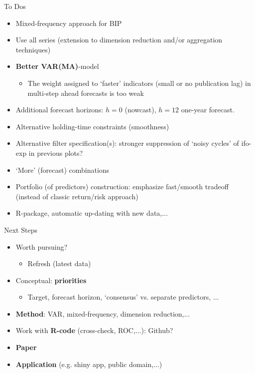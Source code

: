 \documentclass{beamer}
\begin{document}
\begin{frame} {To Dos}
\begin{itemize}
\item Mixed-frequency approach for BIP
\item Use all series (extension to dimension reduction and/or aggregation techniques)
\item \textbf{Better VAR(MA)}-model
\begin{itemize}
\item The weight assigned to `faster' indicators (small or no publication lag) in multi-step ahead forecasts is too weak
\end{itemize}
\item Additional forecast horizons: $h=0$ (nowcast), $h=12$ one-year forecast. 
\item Alternative holding-time constraints (smoothness)
\item Alternative filter specification(s): stronger suppression of `noisy cycles' of ifo-exp in previous plots?
\item `More' (forecast) combinations
\item Portfolio (of predictors) construction: emphasize fast/smooth tradeoff (instead of classic return/risk approach)
\item R-package, automatic up-dating with new data,...
\end{itemize}
\end{frame}



\begin{frame} {Next Steps}
\begin{itemize}
\item Worth pursuing? 
\begin{itemize}
\item Refresh (latest data)
\end{itemize}
\item Conceptual: \textbf{priorities} 
\begin{itemize}
\item Target, forecast horizon, `consensus' vs. separate predictors, ...
\end{itemize}
\item \textbf{Method}: VAR, mixed-frequency, dimension reduction,...
\item Work with \textbf{R-code} (cross-check, ROC,...): {Github}?
\item \textbf{Paper} 
\item \textbf{Application} (e.g. shiny app, public domain,...)
\end{itemize}
\end{frame}
\end{document}
